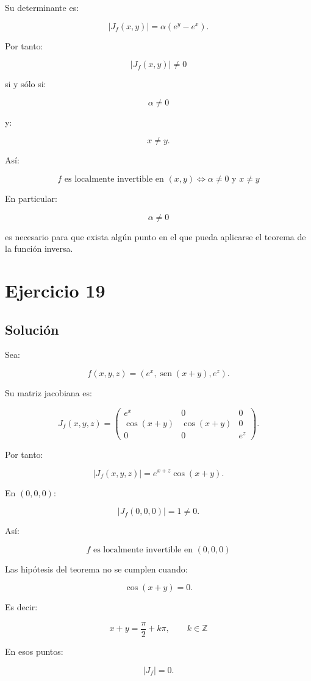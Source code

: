 \documentclass[11pt,a4paper]{article}
\newcommand{\sen}{\operatorname{sen}}
\begin{document}
Su determinante es:

\[
|J_f(x,y)|
=
\alpha(e^y-e^x).
\]

Por tanto:

\[
|J_f(x,y)|\neq0
\]

si y sólo si:

\[
\alpha\neq0
\]

y:

\[
x\neq y.
\]

Así:

\[
\boxed{
f\text{ es localmente invertible en }(x,y)
\iff
\alpha\neq0
\text{ y }
x\neq y
}
\]

En particular:

\[
\boxed{
\alpha\neq0
}
\]

es necesario para que exista algún punto en el que pueda aplicarse el teorema de la función inversa.

\section{Ejercicio 19}
\subsection{Solución}

Sea:

\[
f(x,y,z)
=
\left(
e^x,
\sen(x+y),
e^z
\right).
\]

Su matriz jacobiana es:

\[
J_f(x,y,z)
=
\begin{pmatrix}
e^x&0&0\\
\cos(x+y)&\cos(x+y)&0\\
0&0&e^z
\end{pmatrix}.
\]

Por tanto:

\[
|J_f(x,y,z)|
=
e^{x+z}\cos(x+y).
\]

En \((0,0,0)\):

\[
|J_f(0,0,0)|=1\neq0.
\]

Así:

\[
\boxed{
f\text{ es localmente invertible en }(0,0,0)
}
\]

Las hipótesis del teorema no se cumplen cuando:

\[
\cos(x+y)=0.
\]

Es decir:

\[
\boxed{
x+y
=
\frac{\pi}{2}
+k\pi,
\qquad
k\in\mathbb Z
}
\]

En esos puntos:

\[
|J_f|=0.
\]
\end{document}
